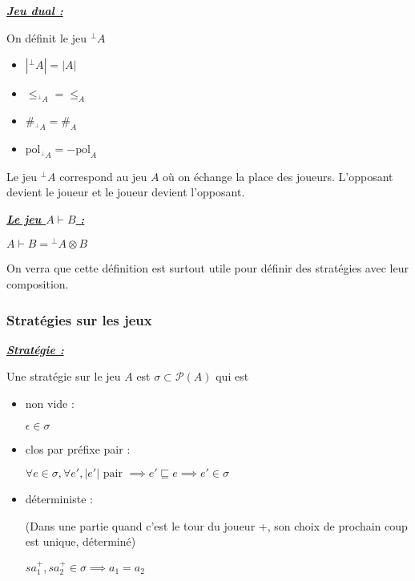 \documentclass[a4paper,12ptCOUCOU
]{article}
\newlength{\mydepth}
\newlength{\myheight}
\newenvironment{answer}
{\par\begin{lrbox}{\mybox}\quad\begin{minipage}{\linewidth}\color{black}\setlength{\parskip}{10pt plus 1pt minus 1pt}\vspace*{-.7\baselineskip}}
{\end{minipage}\end{lrbox}
\settodepth{\mydepth}{\usebox{\mybox}}
\settoheight{\myheight}{\usebox{\mybox}}
\addtolength{\myheight}{\mydepth}
\noindent\makebox[0pt]{
  \color{gray}\hspace{-0pt}\rule[-\mydepth]{1pt}{\myheight}}
\usebox{\mybox}
  }
\begin{document}
\vspace{0.4cm}\begin{minipage}{\linewidth}\textbf{\textit{\underline{ Jeu dual : }}} \begin{answer}
On définit le jeu ${}^\bot A$
\begin{itemize}
\item $|{}^\bot A| = |A|$
\item $\leq_{{}^\bot A} = \leq_A$
\item $\#_{{}^\bot A} = \#_A$
\item $\text{pol}_{{}^\bot A} = - \text{pol}_A$
\end{itemize}
\end{answer}\end{minipage}

Le jeu ${}^\bot A$ correspond au jeu $A$ où on échange la place des joueurs.
L'opposant devient le joueur et le joueur devient l'opposant.

\vspace{0.4cm}\begin{minipage}{\linewidth}\textbf{\textit{\underline{ Le jeu $A \vdash B$ : }}} \begin{answer}
$A \vdash B = {}^\bot A \otimes B$
\end{answer}\end{minipage}

On verra que cette définition est surtout utile pour définir des stratégies
avec leur composition.

\subsubsection{Stratégies sur les jeux}

\vspace{0.4cm}\begin{minipage}{\linewidth}\textbf{\textit{\underline{ Stratégie : }}} \begin{answer}
Une stratégie sur le jeu $A$ est $\sigma \subset \mathcal{P}(A)$ qui est
\begin{itemize}
\item non vide :

$\epsilon \in \sigma$

\item clos par préfixe pair :

$\forall e \in \sigma, \forall e', |e'| \text{ pair } \implies e' \sqsubseteq e \implies e' \in \sigma$

\item déterministe :

(Dans une partie quand c'est le tour du joueur +, son choix de prochain coup
est unique, déterminé)

$sa_1^+, sa_2^+ \in \sigma \implies a_1 = a_2$

\end{itemize}
\end{answer}\end{minipage}
\end{document}
